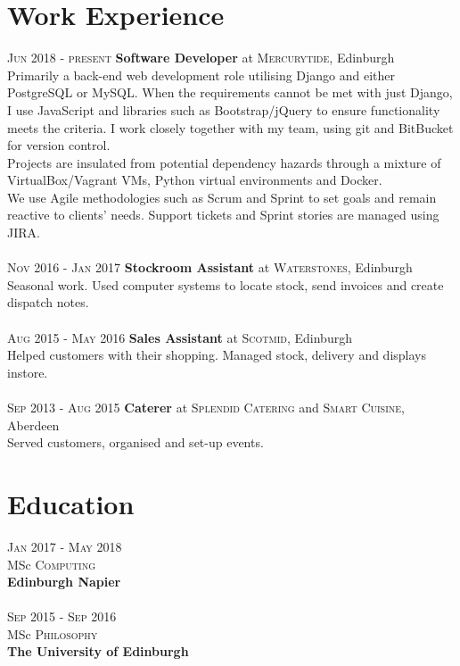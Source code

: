 \documentclass[12pt, a4paper]{article}
\begin{document}
\begin{multicols}{2}
\section{Work Experience}
\noindent\textsc{Jun 2018 - present} \textbf{Software Developer}
at \textsc{Mercurytide}, Edinburgh\\
Primarily a back-end web development role utilising Django and either PostgreSQL or MySQL. When the requirements cannot be met with just Django, I use JavaScript and libraries such as Bootstrap/jQuery to ensure functionality meets the criteria. I work closely together with my team, using git and BitBucket for version control.\\
Projects are insulated from potential dependency hazards through a mixture of VirtualBox/Vagrant VMs, Python virtual environments and Docker.\\
We use Agile methodologies such as Scrum and Sprint to set goals and remain reactive to clients' needs. Support tickets and Sprint stories are managed using JIRA.\\~\\
\textsc{Nov 2016 - Jan 2017} \textbf{Stockroom Assistant}
at \textsc{Waterstones}, Edinburgh\\
Seasonal work. Used computer systems to locate stock, send invoices and create dispatch notes.\\~\\
\textsc{Aug 2015 - May 2016} \textbf{Sales Assistant}
at \textsc{Scotmid}, Edinburgh\\
Helped customers with their shopping. Managed stock, delivery and displays instore.\\~\\
\textsc{Sep 2013 - Aug 2015} \textbf{Caterer}
at \textsc{Splendid Catering} and \textsc{Smart Cuisine}, Aberdeen\\
Served customers, organised and set-up events.\\

\section{Education}
\noindent\textsc{Jan} 2017 - \textsc{May} 2018\\
MSc \textsc{Computing} \\
\textbf{Edinburgh Napier}\\~\\
\textsc{Sep} 2015 - \textsc{Sep} 2016\\
MSc \textsc{Philosophy} \\ 
\textbf{The University of Edinburgh}


\end{multicols}
\end{document}
